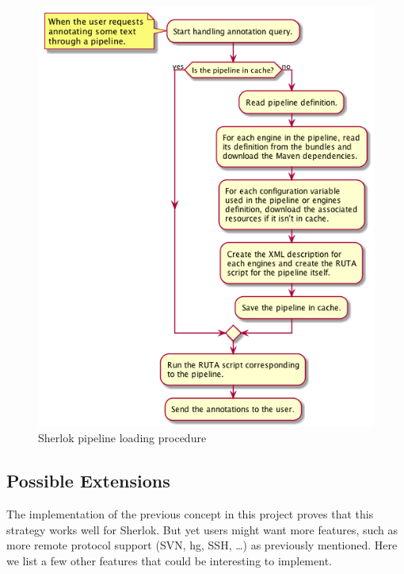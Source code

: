\documentclass{article}
\begin{document}
\begin{figure}
    \centering
    \includegraphics[width=\linewidth]{res/sherlok_load_pipeline.png}
    \caption{Sherlok pipeline loading procedure}
    \label{fig:sherlok_load_pipeline}
\end{figure}

\subsection{Possible Extensions}
\label{sec:config_variable_extensions}

The implementation of the previous concept in this project proves that this strategy works well for
Sherlok. But yet users might want more features, such as more remote protocol support (SVN, hg, SSH,
\dots) as previously mentioned. Here we list a few other features that could be interesting to
implement.
\end{document}
